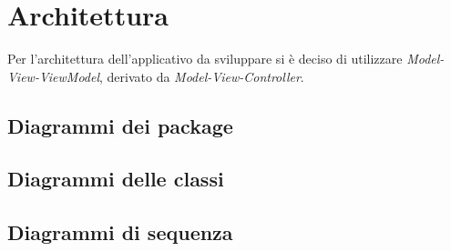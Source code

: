 \section{Architettura}

Per l'architettura dell'applicativo da sviluppare si è deciso di utilizzare \textit{Model-View-ViewModel}, derivato da \textit{Model-View-Controller}.

\subsection{Diagrammi dei package}
\subsection{Diagrammi delle classi}
\subsection{Diagrammi di sequenza}